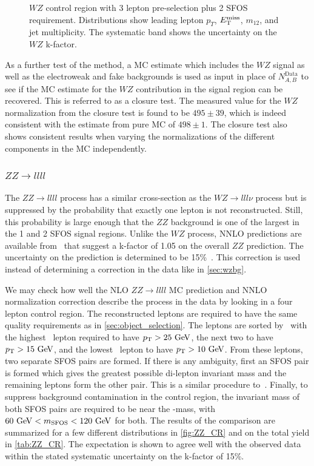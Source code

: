 \begin{figure}[htp]
\caption{$WZ$ control region with 3 lepton pre-selection plus 2 SFOS requirement. 
Distributions show leading lepton $p_{T}$, $E_{\mathrm{T}}^{\mathrm{miss}}$, $m_{12}$, and jet multiplicity. 
The systematic band shows the uncertainty on the $WZ$ k-factor.}
\label{fig:WZ_2SFOS_CR}
\end{figure}  

As a further test of the method, a MC estimate which includes the $WZ$ signal as
well as the electroweak and fake backgrounds is used as input in place 
of $N^{\textrm{Data}}_{A,B}$ to see if the MC estimate for the $WZ$
contribution in the signal region can be recovered. This is referred to as
a closure test.  The measured value for the $WZ$ normalization from the 
closure test is found to be  $495\pm39$, which is indeed consistent with the
estimate from pure MC of $498\pm1$. The closure test also shows consistent
results when varying the normalizations of the different components 
in the MC independently.




\subsubsection{$ZZ\rightarrow llll$}
\label{sec:zzbg}

The $ZZ\rightarrow llll$ process has a similar cross-section as 
the $WZ\rightarrow lll\nu$ process but is 
suppressed by the probability that exactly one lepton is not reconstructed. 
Still, this probability is large enough that the $ZZ$ background is one of the 
largest in the 1 and 2 SFOS signal regions.  
Unlike the $WZ$ process, NNLO predictions are available 
from~\cite{Cascioli:2014yka,Baglio:2013toa,Bierweiler:2013dja}
that suggest a k-factor of 1.05 on the overall $ZZ$ prediction.
The uncertainty on the prediction is determined to be 
15\%~\cite{Cascioli:2014yka,Baglio:2013toa,Bierweiler:2013dja}.
This correction is used instead of determining a correction in the data
like in \sec\ref{sec:wzbg}.

We may check how well the NLO $ZZ\rightarrow llll$ MC prediction and 
NNLO normalization correction describe the process in the data by looking
in a four lepton control region. The reconstructed leptons are required to have
the same quality requirements as in \sec\ref{sec:object_selection}.
The leptons are sorted by \pt~with the highest \pt~lepton
required to have $\pt>25\GeV$, the next two to have
$\pt>15\GeV$, and the lowest \pt~lepton to have $\pt>10\GeV$.
From these leptons, two separate SFOS pairs are formed. If there
is any ambiguity, first an SFOS pair is formed which gives the greatest
possible di-lepton invariant mass and the remaining leptons form the other pair.
This is a similar procedure to~\cite{Aad:2014wra}. Finally, 
to suppress background contamination in the control region,
the invariant mass of both SFOS pairs are required to be near the \z-mass, 
with $60\GeV<m_{\textrm{SFOS}}<120\GeV$ for both.
The results of the comparison are summarized for a few different distributions
in \fig\ref{fig:ZZ_CR} and on the total yield in \tab\ref{tab:ZZ_CR}.
The expectation is shown to agree well with the observed data within the 
stated systematic uncertainty on the k-factor of 15\%. 


